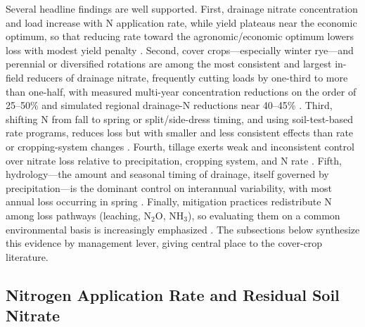 \documentclass[11pt]{article}
\begin{document}
Several headline findings are well supported. First, drainage nitrate concentration and load increase with N application rate, while yield plateaus near the economic optimum, so that reducing rate toward the agronomic/economic optimum lowers loss with modest yield penalty \parencite{Jaynes2001,Helmers2012b,Zhao2016,Hertzberger2019}. Second, cover crops---especially winter rye---and perennial or diversified rotations are among the most consistent and largest in-field reducers of drainage nitrate, frequently cutting loads by one-third to more than one-half, with measured multi-year concentration reductions on the order of 25--50\% and simulated regional drainage-N reductions near 40--45\% \parencite{Ruffatti2019,OBrien2022,PrezaFontes2021,Daigh2015b,Gentry2025,Kaspar2012,Malone2018,Feyereisen2006b,Malone2014b}. Third, shifting N from fall to spring or split/side-dress timing, and using soil-test-based rate programs, reduces loss but with smaller and less consistent effects than rate or cropping-system changes \parencite{Randall2003,Dinnes2002,Jaynes2004}. Fourth, tillage exerts weak and inconsistent control over nitrate loss relative to precipitation, cropping system, and N rate \parencite{RANDALL1995,Weed1996,Randall2001}. Fifth, hydrology---the amount and seasonal timing of drainage, itself governed by precipitation---is the dominant control on interannual variability, with most annual loss occurring in spring \parencite{Randall2003,Bakhsh2010,RANDALL1995}. Finally, mitigation practices redistribute N among loss pathways (leaching, N$_2$O, NH$_3$), so evaluating them on a common environmental basis is increasingly emphasized \parencite{PrezaFontes2023,Menegaz2025}. The subsections below synthesize this evidence by management lever, giving central place to the cover-crop literature.

\subsection{Nitrogen Application Rate and Residual Soil Nitrate}
\end{document}
